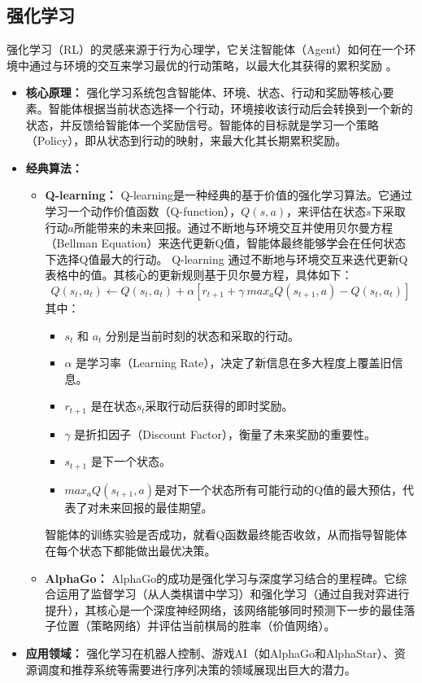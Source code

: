 \subsection{强化学习}
\label{ssec:reinforcement_learning}
强化学习（RL）的灵感来源于行为心理学，它关注智能体（Agent）如何在一个环境中通过与环境的交互来学习最优的行动策略，以最大化其获得的累积奖励 \cite{shakya2023reinforcement}。
\begin{itemize}
    \item \textbf{核心原理：} 强化学习系统包含智能体、环境、状态、行动和奖励等核心要素。智能体根据当前状态选择一个行动，环境接收该行动后会转换到一个新的状态，并反馈给智能体一个奖励信号。智能体的目标就是学习一个策略（Policy），即从状态到行动的映射，来最大化其长期累积奖励。
    \item \textbf{经典算法：}
        \begin{itemize}
            \item \textbf{Q-learning：} Q-learning是一种经典的基于价值的强化学习算法。它通过学习一个动作价值函数（Q-function），$Q(s, a)$，来评估在状态$s$下采取行动$a$所能带来的未来回报。通过不断地与环境交互并使用贝尔曼方程（Bellman Equation）来迭代更新Q值，智能体最终能够学会在任何状态下选择Q值最大的行动。
            Q-learning 通过不断地与环境交互来迭代更新Q表格中的值。其核心的更新规则基于贝尔曼方程，具体如下：
			\[
				Q(s_{t},a_{t})\leftarrow Q(s_{t},a_{t})+\alpha[r_{t+1}+\gamma~max_{a}Q(s_{t+1},a)-Q(s_{t},a_{t})]
			\]
			其中：
			\begin{itemize}
				\item $s_t$ 和 $a_t$ 分别是当前时刻的状态和采取的行动。
				\item $\alpha$ 是学习率（Learning Rate），决定了新信息在多大程度上覆盖旧信息。
				\item $r_{t+1}$ 是在状态$s_t$采取行动后获得的即时奖励。
				\item $\gamma$ 是折扣因子（Discount Factor），衡量了未来奖励的重要性。
				\item $s_{t+1}$ 是下一个状态。
				\item $max_a Q(s_{t+1}, a)$是对下一个状态所有可能行动的Q值的最大预估，代表了对未来回报的最佳期望。
			\end{itemize}
			智能体的训练实验是否成功，就看Q函数最终能否收敛，从而指导智能体在每个状态下都能做出最优决策。
            \item \textbf{AlphaGo：} AlphaGo的成功是强化学习与深度学习结合的里程碑。它综合运用了监督学习（从人类棋谱中学习）和强化学习（通过自我对弈进行提升），其核心是一个深度神经网络，该网络能够同时预测下一步的最佳落子位置（策略网络）并评估当前棋局的胜率（价值网络）。
        \end{itemize}
    \item \textbf{应用领域：} 强化学习在机器人控制、游戏AI（如AlphaGo和AlphaStar）、资源调度和推荐系统等需要进行序列决策的领域展现出巨大的潜力。
\end{itemize}

